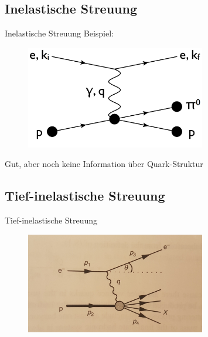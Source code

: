 \documentclass[aspectratio=1610, 9pt]{beamer}
\begin{document}
\subsection{Inelastische Streuung}
\begin{frame}{Inelastische Streuung}
  Beispiel:
  \begin{figure}[H]
  \centering
  \includegraphics[width=0.7\textwidth]{images/inelastic.png}  
  \end{figure}
  Gut, aber noch keine Information über Quark-Struktur
\end{frame}

\subsection{Tief-inelastische Streuung}
\begin{frame}{Tief-inelastische Streuung}
\begin{figure}
  \centering
  \includegraphics[width=0.7\textwidth]{images/ep-deep-inelastic-scattering-1.jpg}
\end{figure}
\end{frame}
\end{document}

